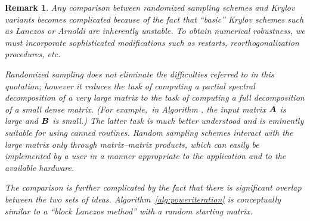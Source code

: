 \documentclass{article}
\newtheorem{remark}{Remark}
\begin{document}
\lsp

\begin{remark} \rm
Any comparison between randomized sampling schemes and Krylov variants
becomes complicated because of the fact that ``basic'' Krylov schemes such
as Lanczos \cite[p.~473]{golub} or Arnoldi \cite[p.~499]{golub}
are inherently unstable. To obtain numerical robustness, we must incorporate
sophisticated modifications such as restarts, reorthogonalization procedures, etc.




\noindent
Randomized sampling does not eliminate the difficulties referred to in this quotation;
however it reduces the task of computing a \emph{partial} spectral decomposition
of a very large matrix to the task of computing a \emph{full} decomposition of
a small dense matrix.  (For example,~in Algorithm \cite[Algorithm 5.1]{RM}, the input matrix
$\bm{A}$ is large and $\bm{B}$ is small.) The latter task is much better understood
and is eminently suitable for using canned routines.  Random sampling schemes
interact with the large matrix only through matrix--matrix products, which can
easily be implemented by a user in a manner appropriate to the application
and to the available hardware.


The comparison is further complicated by the fact that there is significant
overlap between the two sets of ideas. Algorithm~\ref{alg:poweriteration} is
conceptually similar to a ``block Lanczos method'' \cite[p.~485]{golub} with a random starting matrix.

\end{remark}
\end{document}

